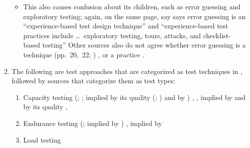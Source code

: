 \begin{enumerate}
\begin{itemize}
              \item This also causes confusion about its children, such as
                    error guessing and exploratory testing; again, on the
                    same page,
                    \ifnotpaper
                        \citeauthor{IEEE2022} say
                    \else
                        \cite[p.~34]{IEEE2022} says
                    \fi error guessing is
                    an ``experience-based test design technique'' and
                    ``experience-based test practices include \dots\
                    exploratory testing, tours, attacks, and
                    checklist-based testing''%
                    \else{.}
                    \fi
                    Other sources also do not agree whether error guessing
                    is a technique
                    \ifnotpaper
                        (pp.~20,~22; \citeyear[p.~viii]{IEEE2021})
                    \else
                        \cite[pp.~20,~22]{IEEE2022}, \cite[p.~viii]{IEEE2021}
                    \fi
                    or a practice \citep[p.~5-14]{SWEBOK2024}.
          \end{itemize}
    \item The following are test approaches that are categorized as test
          techniques in \citep[p.~38]{IEEE2021}, followed by sources that
          categorize them as test types:
          \begin{enumerate}
              \item Capacity testing
                    \ifnotpaper
                        (\citealp[p.~22]{IEEE2022};
                        \citeyear[p.~2]{IEEE2013}; implied by its quality
                        (\citealp{ISO_IEC2023a}; \citealp[Tab.~A.1]{IEEE2021})
                        and by \citep[p.~53]{Firesmith2015})
                    \else
                        \cite[p.~22]{IEEE2022}, \cite[p.~2]{IEEE2013}, implied by
                        \cite[p.~53]{Firesmith2015} and by its quality
                        \cite{ISO_IEC2023a}, \cite[Tab.~A.1]{IEEE2021}
                    \fi
              \item Endurance testing
                    \ifnotpaper
                        (\citealp[p.~2]{IEEE2013};
                        implied by \citep[p.~55]{Firesmith2015})
                    \else
                        \cite[p.~2]{IEEE2013},
                        implied by \cite[p.~55]{Firesmith2015}
                    \fi
              \item Load testing

\end{enumerate}
\end{enumerate}
